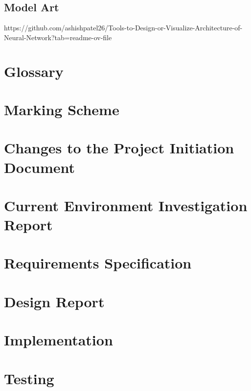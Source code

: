 \documentclass[preprint,12pt,review,authoryear]{elsarticle}
\begin{document}
\subsection{Model Art}
https://github.com/ashishpatel26/Tools-to-Design-or-Visualize-Architecture-of-Neural-Network?tab=readme-ov-file

\newpage
\onecolumn
\section{Glossary}
\renewcommand{\thepage}{A\arabic{page}}
\newpage
\section{Marking Scheme}
\renewcommand{\thepage}{B\arabic{page}}
\newpage
\section{Changes to the Project Initiation Document}
\renewcommand{\thepage}{C\arabic{page}}
\newpage
\section{Current Environment Investigation Report}
\renewcommand{\thepage}{D\arabic{page}}
\newpage
\section{Requirements Specification}
\renewcommand{\thepage}{E\arabic{page}}
\newpage
\section{Design Report}
\renewcommand{\thepage}{F\arabic{page}}
\newpage
\section{Implementation}
\renewcommand{\thepage}{G\arabic{page}}
\newpage
\section{Testing}
\renewcommand{\thepage}{H\arabic{page}}
\newpage
\end{document}
